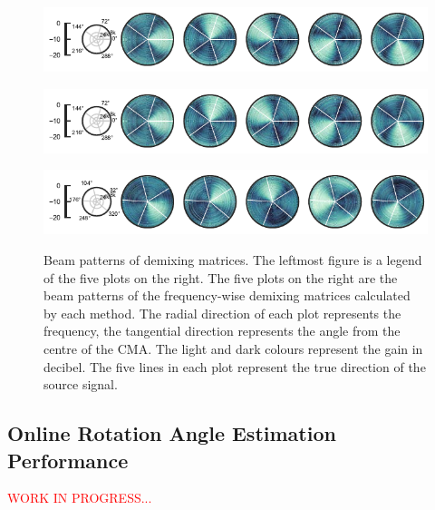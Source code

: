 \documentclass[sip,biber]{now-journal}
\newcommand{\todo}[1]{\textcolor{red}{#1}}
\begin{document}
\begin{figure}[t]
  \centering
  \begin{minipage}[t]{\linewidth}
    \centering\includegraphics{figures/plots/beam-pattern/sfiiva-cov_ref.pdf}\label{fig:plot:bp:ref}
  \end{minipage}
  \begin{minipage}[t]{\linewidth}
    \centering\includegraphics{figures/plots/beam-pattern/sfiiva-obs_rot.pdf}\label{fig:plot:bp:sfiivao}
  \end{minipage}
  \begin{minipage}[t]{\linewidth}
    \centering\includegraphics{figures/plots/beam-pattern/sfiiva-cov_rot.pdf}\label{fig:plot:bp:sfiivam}
  \end{minipage}
  \caption{%
    Beam patterns of demixing matrices.
    The leftmost figure is a legend of the five plots on the right.
    The five plots on the right are the beam patterns of the frequency-wise demixing matrices calculated by each method.
    The radial direction of each plot represents the frequency, the tangential direction represents the angle from the centre of the CMA.
    The light and dark colours represent the gain in decibel.
    The five lines in each plot represent the true direction of the source signal.
  }%
  \label{fig:plots:bp:pol}
\end{figure}

\subsection{Online Rotation Angle Estimation Performance}
\todo{WORK IN PROGRESS...}
\end{document}
